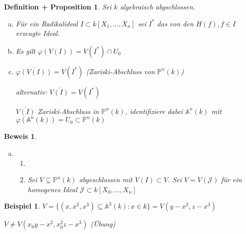 \documentclass[a4paper, 12pt, numbers=noendperiod, chapterprefix=true]{scrbook}
\theoremstyle{break}
\newtheorem{DefProp}[Def]{Definition + Proposition}
\theoremstyle{nonumberbreak}
\newtheorem{nnBsp}{Beispiel}
\newtheorem{Bew}{Beweis}
\theoremstyle{nonumberplain}
\newcommand{\quot}[1]{\textrm{\glqq}{#1}\textrm{\grqq}}
\newenvironment{twosidedproofeq}{\begin{enumerate}[\quot{$\subseteq$}:]}{\end{enumerate}}
\newcommand{\proofsubseteq}{\item[\quot{$\subseteq$}:]}
\newcommand{\proofsupseteq}{\item[\quot{$\supseteq$}:]}
\newcommand{\A}{\mathbb{A}}
\newcommand{\IP}{\mathbb{P}}%
\newcommand{\calJ}{\mathcal{J}}
\begin{document}
\begin{DefProp}
Sei $k$ algebraisch abgschlossen.\begin{enumerate}[a)]
\item
	F\"ur ein Radikalideal $I\subset k[X_1,\ldots ,X_n]$ sei $I^*$ das von den $H(f),f\in I$ erzeugte Ideal.

\item
	Es gilt $\varphi(V(I))=V(I^*)\cap U_0$

\item
	$\overline{\varphi(V(I))}=V(I^*)$ (Zariski-Abschluss von $\IP^n(k)$)
	
	\emph{alternativ:} $\overline{V(I)}=V(I^*)$
	
	$\overline{V(I)}$ Zariski-Abschluss in $\IP^n(k)$, identifiziere dabei $\A^n(k)$ mit $\varphi(\A^n(k))=U_0\subset\IP^n(k)$
\end{enumerate}\end{DefProp}

\begin{Bew}\begin{enumerate}[a)]\item[c)]\begin{twosidedproofeq}\proofsubseteq \checkmark \proofsupseteq
Sei $V\subseteq\IP^n(k)$ abgeschlossen mit $V(I)\subset V$. Sei $V=V(\calJ)$ f\"ur ein homogenes Ideal $\calJ\subset k[X_0,\ldots ,X_n]$
\end{twosidedproofeq}\end{enumerate}\end{Bew}

\begin{nnBsp}
$V=\{(x,x^2,x^3)\subseteq\A^3(k) : x\in k\}=V(y-x^2, z-x^3)$

$\overline V \ne V(x_0y-x^2,x_0^2z-x^3)$ (\"Ubung)
\end{nnBsp}
\end{document}
